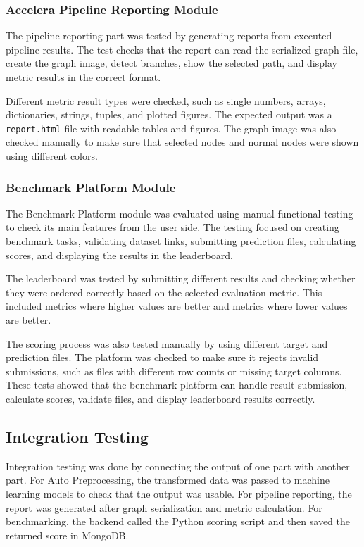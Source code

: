 \documentclass[12pt,a4paper]{report}
\begin{document}
\subsubsection{Accelera Pipeline Reporting Module}

The pipeline reporting part was tested by generating reports from executed
pipeline results. The test checks that the report can read the serialized graph
file, create the graph image, detect branches, show the selected path, and
display metric results in the correct format.

Different metric result types were checked, such as single numbers, arrays,
dictionaries, strings, tuples, and plotted figures. The expected output was a
\texttt{report.html} file with readable tables and figures. The graph image was
also checked manually to make sure that selected nodes and normal nodes were
shown using different colors.

\subsubsection{Benchmark Platform Module}

The Benchmark Platform module was evaluated using manual functional testing to check its main features from the user side. The testing focused on creating benchmark tasks, validating dataset links, submitting prediction files, calculating scores, and displaying the results in the leaderboard.

\noindent The leaderboard was tested by submitting different results and checking whether they were ordered correctly based on the selected evaluation metric. This included metrics where higher values are better and metrics where lower values are better.

\noindent The scoring process was also tested manually by using different target and prediction files. The platform was checked to make sure it rejects invalid submissions, such as files with different row counts or missing target columns. These tests showed that the benchmark platform can handle result submission, calculate scores, validate files, and display leaderboard results correctly.

\subsection{Integration Testing}

Integration testing was done by connecting the output of one part with another
part. For Auto Preprocessing, the transformed data was passed to machine
learning models to check that the output was usable. For pipeline reporting,
the report was generated after graph serialization and metric calculation. For
benchmarking, the backend called the Python scoring script and then saved the
returned score in MongoDB.
\end{document}
